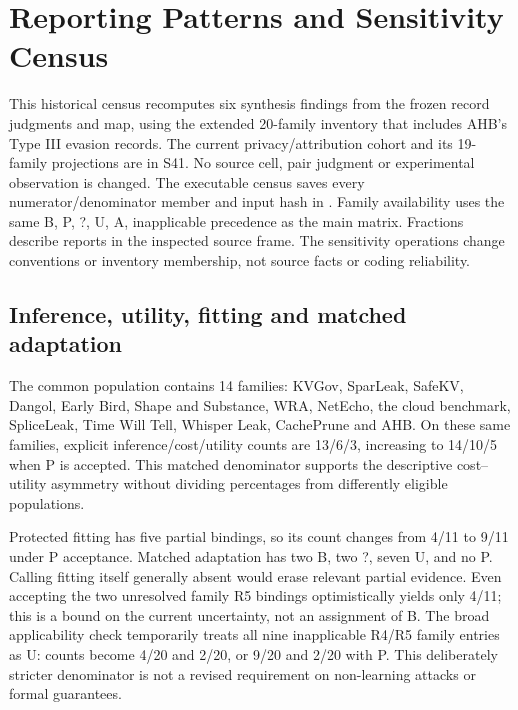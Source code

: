 \section{Reporting Patterns and Sensitivity Census}\label{app:r34}
This historical census recomputes six synthesis findings from the frozen record judgments and map, using the extended 20-family inventory that includes AHB's Type III evasion records. The current privacy/attribution cohort and its 19-family projections are in S41. No source cell, pair judgment or experimental observation is changed. The executable census  saves every numerator/denominator member and input hash in . Family availability uses the same B, P, ?, U, A, inapplicable precedence as the main matrix. Fractions describe reports in the inspected source frame. The sensitivity operations change conventions or inventory membership, not source facts or coding reliability.

\subsection{Inference, utility, fitting and matched adaptation}

The common population contains 14 families: KVGov, SparLeak, SafeKV, Dangol, Early Bird, Shape and Substance, WRA, NetEcho, the cloud benchmark, SpliceLeak, Time Will Tell, Whisper Leak, CachePrune and AHB. On these same families, explicit inference/cost/utility counts are 13/6/3, increasing to 14/10/5 when P is accepted. This matched denominator supports the descriptive cost--utility asymmetry without dividing percentages from differently eligible populations.

Protected fitting has five partial bindings, so its count changes from 4/11 to 9/11 under P acceptance. Matched adaptation has two B, two ?, seven U, and no P. Calling fitting itself generally absent would erase relevant partial evidence. Even accepting the two unresolved family R5 bindings optimistically yields only 4/11; this is a bound on the current uncertainty, not an assignment of B. The broad applicability check temporarily treats all nine inapplicable R4/R5 family entries as U: counts become 4/20 and 2/20, or 9/20 and 2/20 with P. This deliberately stricter denominator is not a revised requirement on non-learning attacks or formal guarantees.


